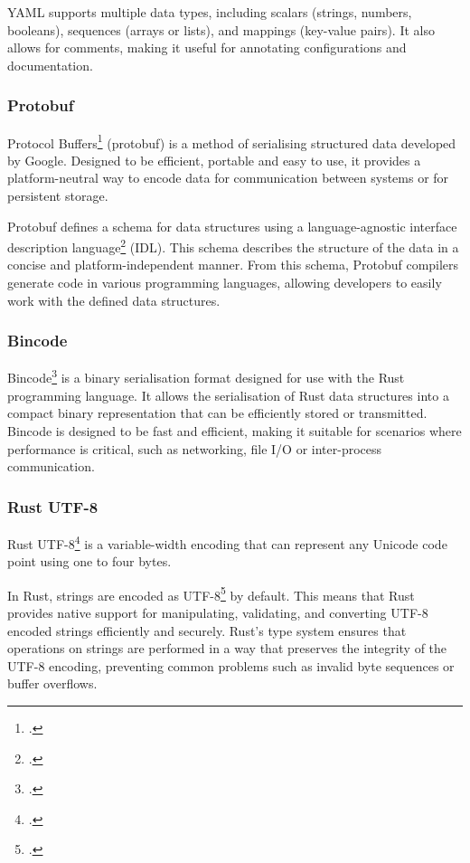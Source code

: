 YAML supports multiple data types, including scalars (strings, numbers, booleans), sequences (arrays or lists), and mappings (key-value pairs). It also allows for comments, making it useful for annotating configurations and documentation.

\subsubsection{Protobuf}
Protocol Buffers\footcite{protobuf} (protobuf) is a method of serialising structured data developed by Google. Designed to be efficient, portable and easy to use, it provides a platform-neutral way to encode data for communication between systems or for persistent storage.

Protobuf defines a schema for data structures using a language-agnostic interface description language\footcite{idl} (IDL). This schema describes the structure of the data in a concise and platform-independent manner. From this schema, Protobuf compilers generate code in various programming languages, allowing developers to easily work with the defined data structures.

\subsubsection{Bincode}
Bincode\footcite{bincode} is a binary serialisation format designed for use with the Rust programming language. It allows the serialisation of Rust data structures into a compact binary representation that can be efficiently stored or transmitted. Bincode is designed to be fast and efficient, making it suitable for scenarios where performance is critical, such as networking, file I/O or inter-process communication.

\subsubsection{Rust UTF-8}
Rust UTF-8\footcite{rust_utf8} is a variable-width encoding that can represent any Unicode code point using one to four bytes.

In Rust, strings are encoded as UTF-8\footcite{utf8} by default. This means that Rust provides native support for manipulating, validating, and converting UTF-8 encoded strings efficiently and securely. Rust's type system ensures that operations on strings are performed in a way that preserves the integrity of the UTF-8 encoding, preventing common problems such as invalid byte sequences or buffer overflows.


